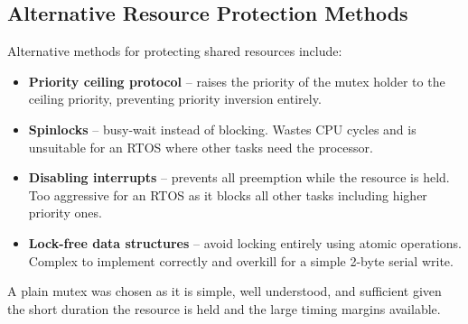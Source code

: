 \subsection{Alternative Resource Protection Methods}
Alternative methods for protecting shared resources include:
\begin{itemize}
    \item \textbf{Priority ceiling protocol} -- raises the priority of the mutex 
    holder to the ceiling priority, preventing priority inversion entirely.
    \item \textbf{Spinlocks} -- busy-wait instead of blocking. Wastes CPU cycles 
    and is unsuitable for an RTOS where other tasks need the processor.
    \item \textbf{Disabling interrupts} -- prevents all preemption while the 
    resource is held. Too aggressive for an RTOS as it blocks all other tasks 
    including higher priority ones.
    \item \textbf{Lock-free data structures} -- avoid locking entirely using 
    atomic operations. Complex to implement correctly and overkill for a simple 
    2-byte serial write.
\end{itemize}
A plain mutex was chosen as it is simple, well understood, and sufficient given 
the short duration the resource is held and the large timing margins available.